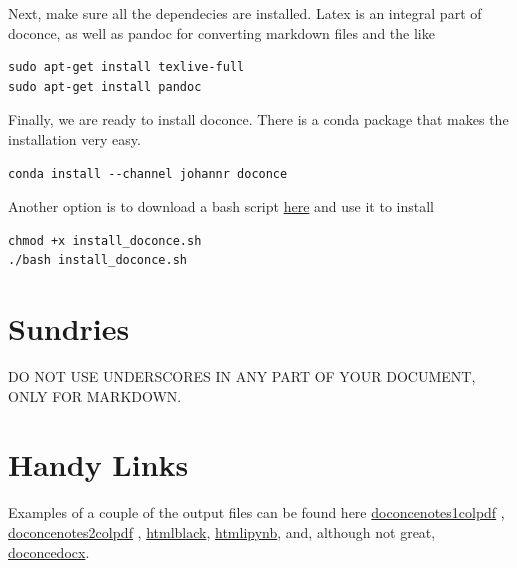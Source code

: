 \documentclass[%
twocolumn,
twoside,                 %
final,                   %
10pt]{article}
\begin{document}
Next, make sure all the dependecies are installed. Latex is an integral part of doconce, as well as pandoc for converting markdown files and the like
\begin{verbatim}
sudo apt-get install texlive-full
sudo apt-get install pandoc
\end{verbatim}

Finally, we are ready to install doconce. There is a conda package that makes the installation very easy. 
\begin{verbatim}
conda install --channel johannr doconce
\end{verbatim}

Another option is to download a bash script \href{{https://raw.githubusercontent.com/hplgit/doconce/master/doc/src/manual/install_doconce.sh}}{here} and use it to install
\begin{verbatim}
chmod +x install_doconce.sh  
./bash install_doconce.sh
\end{verbatim}

\section{Sundries}

DO NOT USE UNDERSCORES IN ANY PART OF YOUR DOCUMENT, ONLY FOR MARKDOWN.


\section{Handy Links}
\label{sec:links}

Examples of a couple of the output files can be found here
\href{{https://github.com/nagordon/technotes/blob/master/doconce/doconce_notes.1col.pdf}}{doconcenotes1colpdf} , \href{{https://github.com/nagordon/technotes/blob/master/doconce/doconce_notes.2col.pdf}}{doconcenotes2colpdf} , \href{{https://github.com/nagordon/technotes/blob/master/doconce/doconce_notes.html.pdf}}{htmlblack}, \href{{https://github.com/nagordon/technotes/blob/master/doconce/doconce_notes.ipynb.pdf}}{htmlipynb}, and, although not great, \href{{https://github.com/nagordon/technotes/blob/master/doconce/doconce_notes.md.docx}}{doconcedocx}.
\end{document}
